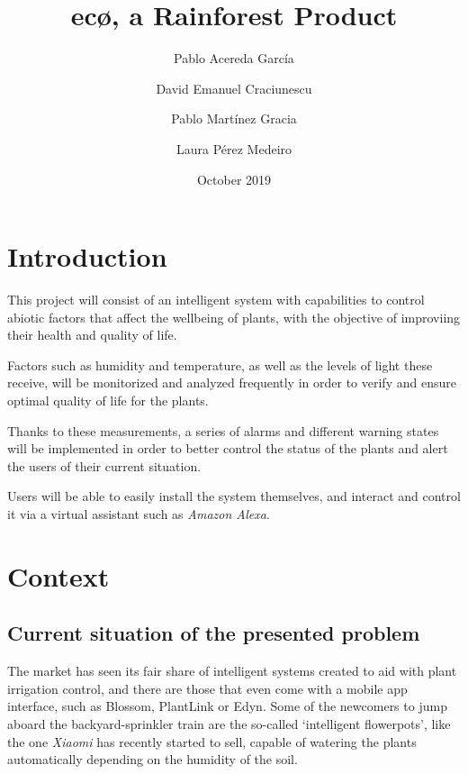 \documentclass[english,runningheads,a4paper]{llncs}[2018/03/10]
\title{ec\textbf{\o}, a Rainforest Product}
\author{
    Pablo Acereda García \and
    David Emanuel Craciunescu \and
    Pablo Martínez Gracia \and
    Laura Pérez Medeiro
}
\date{October 2019}
\begin{document}
\maketitle


\section*{Introduction}

This project will consist of an intelligent system with capabilities to control
abiotic factors that affect the wellbeing of plants, with the objective of
improviing their health and quality of life.

Factors such as humidity and temperature, as well as the levels of light these
receive, will be monitorized and analyzed frequently in order to verify and
ensure optimal quality of life for the plants.

Thanks to these measurements, a series of alarms and different warning states
will be implemented in order to better control the status of the plants and
alert the users of their current situation.

Users will be able to easily install the system themselves, and interact and
control it via a virtual assistant such as \textit{Amazon Alexa}.


\section*{Context}


    \subsection*{Current situation of the presented problem}

    The market has seen its fair share of intelligent systems created to aid
    with plant irrigation control, and there are those that even come with a
    mobile app interface, such as Blossom, PlantLink or Edyn. Some of the
    newcomers to jump aboard the backyard-sprinkler train are the so-called
    `intelligent flowerpots', like the one \textit{Xiaomi} has recently started
    to sell, capable of watering the plants automatically depending on the
    humidity of the soil.
\end{document}
